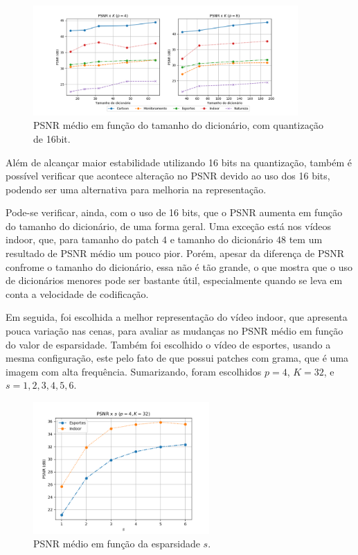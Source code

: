 \documentclass[cic,tc]{iiufrgs}
\begin{document}
\begin{figure}[H]
    \caption{PSNR médio em função do tamanho do dicionário, com quantização de 16bit.}
    \begin{center}
        \includegraphics[width=0.9\textwidth]{img/graficos/ds_psnr_16bit.png}
    \end{center}
    \label{fig:psnr16bit}
\end{figure}

Além de alcançar maior estabilidade utilizando 16 bits na quantização, 
também é possível verificar que acontece alteração no PSNR devido ao uso 
dos 16 bits, podendo ser uma alternativa para melhoria na representação.

Pode-se verificar, ainda, com o uso de 16 bits, que o PSNR aumenta em função 
do tamanho do dicionário, de uma forma geral.
Uma exceção está nos vídeos indoor, que, para tamanho do patch $4$ e tamanho do dicionário $48$
tem um resultado de PSNR médio um pouco pior.
Porém, apesar da diferença de PSNR confrome o tamanho do dicionário, essa não é 
tão grande, o que mostra que o uso de dicionários menores pode ser bastante útil,
especialmente quando se leva em conta a velocidade de codificação.

Em seguida, foi escolhida a melhor representação do vídeo indoor, que apresenta 
pouca variação nas cenas, para avaliar as mudanças no PSNR médio em função do valor 
de esparsidade.
Também foi escolhido o vídeo de esportes, usando a mesma configuração, este pelo fato 
de que possui patches com grama, que é uma imagem com alta frequência.
Sumarizando, foram escolhidos $p=4$, $K=32$, e $s=1,2,3,4,5,6$.

\begin{figure}[H]
    \caption{PSNR médio em função da esparsidade $s$.}
    \begin{center}
        \includegraphics[width=0.6\textwidth]{img/graficos/p4d32_sv_psnr.png}
    \end{center}
    \label{fig:psnrsvar}
\end{figure}
\end{document}
